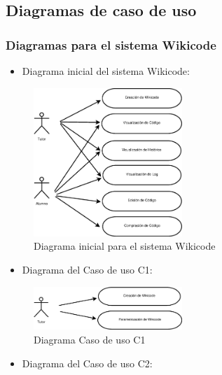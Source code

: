 \newpage

\subsection{Diagramas de caso de uso}

\subsubsection{Diagramas para el sistema Wikicode}

\begin{itemize}
	\item Diagrama inicial del sistema Wikicode:
\end{itemize}

\begin{figure}[h]
	\centering
	\includegraphics[width=0.5\textwidth]{./img/c3-cu-ini.eps}
	\caption{Diagrama inicial para el sistema Wikicode}
\end{figure}

\vspace{1cm}

\begin{itemize}
	\item Diagrama del Caso de uso C1:
\end{itemize}

\begin{figure}[h]
	\centering
	\includegraphics[width=0.5\textwidth]{./img/c3-cu1.eps}
	\caption{Diagrama Caso de uso C1}
\end{figure}

\newpage

\begin{itemize}
	\item Diagrama del Caso de uso C2:
\end{itemize}

